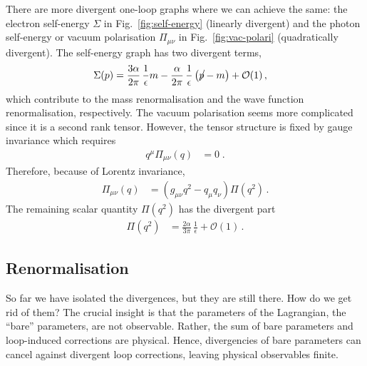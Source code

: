 \documentclass[12pt]{report}
\renewcommand{\slash}[2][4]{\ensuremath{\rlap{\raisebox{1pt}{$\mspace{#1mu}/$}}#2}}
\newcommand{\2}{\ensuremath{\sqrt{2}\,}}
\begin{document}
{      There are more divergent one-loop graphs where we can achieve the same: the electron
      self-energy $\Sigma$ in Fig.~\ref{fig:self-energy} (linearly
      divergent) and the photon self-energy or vacuum polarisation $\Pi_{\mu\nu}$ in Fig.~\ref{fig:vac-polari} (quadratically divergent). The
      self-energy graph has two divergent terms,  
      \begin{align}
        \Sigma(p)&= \frac{3\alpha}{2\pi}\, \frac{1}{\epsilon} m - \frac{\alpha}{2\pi}\,
        \frac{1}{\epsilon}\left(\slash[2]{p} -m\right) +\mathcal{O}(1)\,,
      \end{align}
      which contribute to the mass renormalisation and the wave function renormalisation,
      respectively. The vacuum polarisation seems more complicated since it is a second rank
      tensor. However, the tensor structure is fixed by gauge invariance which requires
      \begin{align}
        q^\mu \Pi_{\mu\nu}\left(q\right) &= 0\;.
      \end{align}
      Therefore, because of Lorentz invariance,
      \begin{align}
        \Pi_{\mu\nu}\left(q\right) &= \left(g_{\mu\nu} q^2 - q_\mu q_\nu\right) \Pi\! \left(q^2\right)
        \,.
      \end{align}
      The remaining scalar quantity $\Pi(q^2)$ has the divergent part
      \begin{align}
        \Pi\!\left(q^2\right) &= \frac{2\alpha}{3\pi} \, \frac{1}{\epsilon}  +\mathcal{O}(1)\,.
      \end{align}

      


      \subsection{Renormalisation}
      So far we have isolated the divergences, but they are still there. How do we get rid of
      them? The crucial insight is that the parameters of the Lagrangian, the ``bare'' parameters,
      are not observable. Rather, the sum of bare parameters and loop-induced corrections are
      physical. Hence, divergencies of bare parameters  can cancel against divergent loop
      corrections, leaving physical observables finite. 

}
\end{document}
